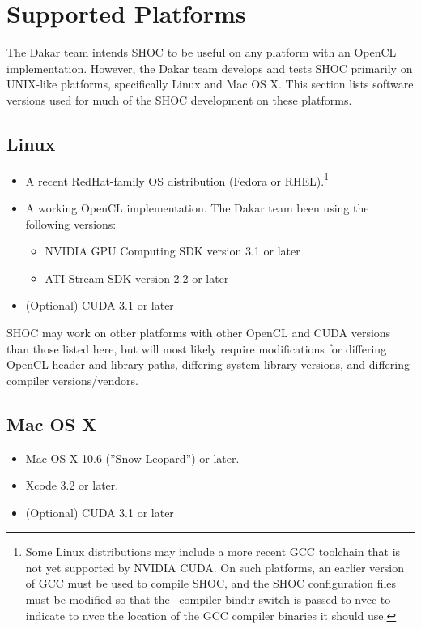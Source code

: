\documentclass[11pt]{article}
\begin{document}
\section{Supported Platforms}\label{sec:supported}

The Dakar team intends SHOC to be useful on any platform with an
OpenCL implementation. However, the Dakar team develops and tests
SHOC primarily on UNIX-like platforms, specifically Linux and
Mac OS X.
This section lists software versions used for much of the SHOC development
on these platforms.

\subsection{Linux}

\begin{itemize}
\item A recent RedHat-family OS distribution (Fedora or RHEL).\footnote{
Some Linux distributions may include a more recent GCC toolchain that is
not yet supported by NVIDIA CUDA.  On such platforms, an earlier version of GCC
must be used to compile SHOC, and the SHOC configuration files must be
modified so that the --compiler-bindir switch is passed to nvcc to 
indicate to nvcc the location of the GCC compiler binaries it should use.}
\item A working OpenCL implementation. The Dakar team been using the following
versions:
    \begin{itemize}
        \item NVIDIA GPU Computing SDK version 3.1 or later
        \item ATI Stream SDK version 2.2 or later
    \end{itemize}
\item (Optional) CUDA 3.1 or later
\end{itemize}

SHOC may work on other platforms with other OpenCL and CUDA versions
than those listed here, but will most likely require modifications for
differing OpenCL header and library paths, differing system library versions,
and differing compiler versions/vendors.

\subsection{Mac OS X}

\begin{itemize}
\item Mac OS X 10.6 (''Snow Leopard'') or later.
\item Xcode 3.2 or later.
\item (Optional) CUDA 3.1 or later
\end{itemize}
\end{document}
